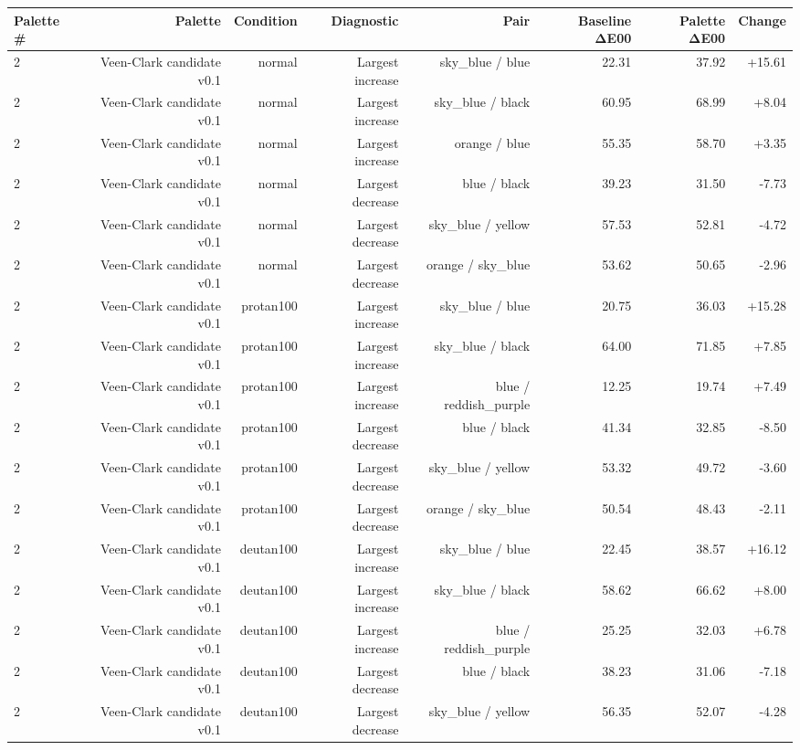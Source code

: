\begin{tabular}{lrrrrrrr}
\toprule
Palette \# & Palette & Condition & Diagnostic & Pair & Baseline ΔE00 & Palette ΔE00 & Change \\
\midrule
2 & Veen-Clark candidate v0.1 & normal & Largest increase & sky\_blue / blue & 22.31 & 37.92 & +15.61 \\
2 & Veen-Clark candidate v0.1 & normal & Largest increase & sky\_blue / black & 60.95 & 68.99 & +8.04 \\
2 & Veen-Clark candidate v0.1 & normal & Largest increase & orange / blue & 55.35 & 58.70 & +3.35 \\
2 & Veen-Clark candidate v0.1 & normal & Largest decrease & blue / black & 39.23 & 31.50 & -7.73 \\
2 & Veen-Clark candidate v0.1 & normal & Largest decrease & sky\_blue / yellow & 57.53 & 52.81 & -4.72 \\
2 & Veen-Clark candidate v0.1 & normal & Largest decrease & orange / sky\_blue & 53.62 & 50.65 & -2.96 \\
2 & Veen-Clark candidate v0.1 & protan100 & Largest increase & sky\_blue / blue & 20.75 & 36.03 & +15.28 \\
2 & Veen-Clark candidate v0.1 & protan100 & Largest increase & sky\_blue / black & 64.00 & 71.85 & +7.85 \\
2 & Veen-Clark candidate v0.1 & protan100 & Largest increase & blue / reddish\_purple & 12.25 & 19.74 & +7.49 \\
2 & Veen-Clark candidate v0.1 & protan100 & Largest decrease & blue / black & 41.34 & 32.85 & -8.50 \\
2 & Veen-Clark candidate v0.1 & protan100 & Largest decrease & sky\_blue / yellow & 53.32 & 49.72 & -3.60 \\
2 & Veen-Clark candidate v0.1 & protan100 & Largest decrease & orange / sky\_blue & 50.54 & 48.43 & -2.11 \\
2 & Veen-Clark candidate v0.1 & deutan100 & Largest increase & sky\_blue / blue & 22.45 & 38.57 & +16.12 \\
2 & Veen-Clark candidate v0.1 & deutan100 & Largest increase & sky\_blue / black & 58.62 & 66.62 & +8.00 \\
2 & Veen-Clark candidate v0.1 & deutan100 & Largest increase & blue / reddish\_purple & 25.25 & 32.03 & +6.78 \\
2 & Veen-Clark candidate v0.1 & deutan100 & Largest decrease & blue / black & 38.23 & 31.06 & -7.18 \\
2 & Veen-Clark candidate v0.1 & deutan100 & Largest decrease & sky\_blue / yellow & 56.35 & 52.07 & -4.28 \\

\end{tabular}
